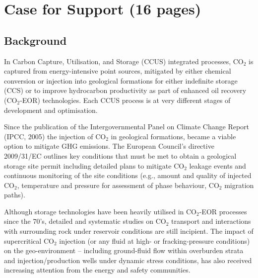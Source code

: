 \documentclass[12pts,a4paper,amsmath,amssymb,floatfix]{article}%
\newcommand{\CO}{CO\ensuremath{_{2}}}
\begin{document}
\clearpage

\section{Case for Support (16 pages)}

\subsection{Background}

In Carbon Capture, Utilisation, and Storage (CCUS) integrated processes, \CO\; is captured from energy-intensive point sources, mitigated by either chemical conversion or injection into geological formations for either indefinite storage (CCS) or to improve hydrocarbon productivity as part of enhanced oil recovery (\CO-EOR) technologies. Each CCUS process is at very different stages of development and optimisation. 

Since the publication of the Intergovernmental Panel on Climate Change Report (IPCC, 2005) the injection of \CO\; in geological formations, became a viable option to mitigate GHG emissions. The European Council's directive 2009/31/EC outlines key conditions that must be met to obtain a geological storage site permit including detailed plans to mitigate \CO\; leakage events and continuous monitoring of the site conditions (e.g., amount and quality of injected \CO, temperature and pressure for assessment of phase behaviour, \CO\; migration paths).

Although storage technologies have been heavily utilised in \CO-EOR processes since the 70's, detailed and systematic studies on \CO\; transport and interactions with surrounding rock under reservoir conditions are still incipient. The impact of supercritical \CO\; injection (or any fluid at high- or fracking-pressure conditions) on the geo-environment -- including ground-fluid flow within overburden strata and injection/production wells under dynamic stress conditions, has also received increasing attention from the energy and safety communities.
\end{document}
